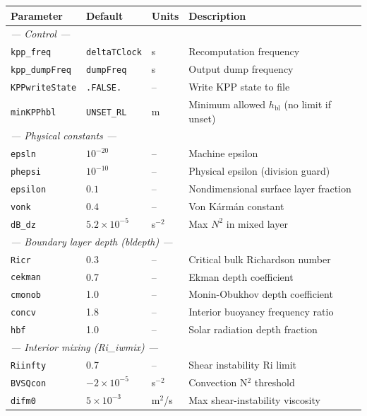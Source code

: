\documentclass[12pt,letterpaper]{article}
\newcommand{\hbl}{h_{\mathrm{bl}}}
\begin{document}
\begin{longtable}{lll p{4.5cm}}  
\toprule  
\textbf{Parameter} & \textbf{Default} & \textbf{Units} &  
\textbf{Description} \\  
\midrule  
\endhead  
\multicolumn{4}{l}{\textit{--- Control ---}} \\  
\texttt{kpp\_freq}      & \texttt{deltaTClock} & s & Recomputation frequency \\  
\texttt{kpp\_dumpFreq}  & \texttt{dumpFreq}    & s & Output dump frequency \\  
\texttt{KPPwriteState}  & \texttt{.FALSE.}     & -- & Write KPP state to file \\  
\texttt{minKPPhbl}      & \texttt{UNSET\_RL}   & m  & Minimum allowed $\hbl$ (no limit if unset) \\  
\midrule  
\multicolumn{4}{l}{\textit{--- Physical constants ---}} \\  
\texttt{epsln}   & $10^{-20}$ & -- & Machine epsilon \\  
\texttt{phepsi}  & $10^{-10}$ & -- & Physical epsilon (division guard) \\  
\texttt{epsilon} & $0.1$      & -- & Nondimensional surface layer fraction \\  
\texttt{vonk}    & $0.4$      & -- & Von K\'{a}rm\'{a}n constant \\  
\texttt{dB\_dz}  & $5.2\times10^{-5}$ & s$^{-2}$ & Max $N^2$ in mixed layer \\  
\midrule  
\multicolumn{4}{l}{\textit{--- Boundary layer depth (bldepth) ---}} \\  
\texttt{Ricr}   & 0.3  & -- & Critical bulk Richardson number \\  
\texttt{cekman} & 0.7  & -- & Ekman depth coefficient \\  
\texttt{cmonob} & 1.0  & -- & Monin-Obukhov depth coefficient \\  
\texttt{concv}  & 1.8  & -- & Interior buoyancy frequency ratio \\  
\texttt{hbf}    & 1.0  & -- & Solar radiation depth fraction \\  
\midrule  
\multicolumn{4}{l}{\textit{--- Interior mixing (Ri\_iwmix) ---}} \\  
\texttt{Riinfty}  & 0.7                  & --     & Shear instability Ri limit \\  
\texttt{BVSQcon}  & $-2\times10^{-5}$   & s$^{-2}$ & Convection N$^2$ threshold \\  
\texttt{difm0}    & $5\times10^{-3}$    & m$^2$/s & Max shear-instability viscosity \\  

\end{longtable}
\end{document}
